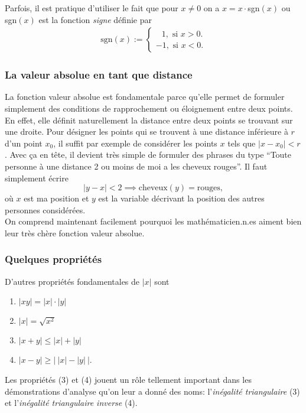 \documentclass[oneside,11pt,french,table]{book}
\theoremstyle{definition}
\theoremstyle{plain}
\theoremstyle{remark}
\begin{document}
    Parfois, il est pratique d'utiliser le fait que pour $x\ne 0$ on a $x=x\cdot$sgn$(x)$ ou sgn$(x)$ est la fonction \textit{signe} définie par 
    \begin{align*}
        \text{sgn}(x):=\begin{cases} \; \; \, 1, \text{ si } x> 0. \\ 
        -1, \text{ si } x<0.
        \end{cases}
    \end{align*}
    \subsubsection{La valeur absolue en tant que distance}
    \noindent
    La fonction valeur absolue est fondamentale parce qu'elle permet de formuler simplement des conditions de rapprochement ou éloignement entre deux points. 
    En effet, elle définit naturellement la distance entre deux points se trouvant sur une droite. Pour désigner les points qui se trouvent à une distance inférieure à $r$ d'un point $x_0$, il suffit par exemple de considérer les points $x$ tels que $|x-x_0|<r$.
    Avec ça en tête, il devient très simple de formuler des phrases du type ``Toute personne à une distance 2 ou moins de moi a les cheveux rouges''. Il faut simplement écrire
    \[
        |y-x|<2\implies \text{cheveux}(y) = \text{rouges},
    \]
    où $x$ est ma position et $y$ est la variable décrivant la position des autres personnes considérées. \\
    On comprend maintenant facilement pourquoi les mathématicien.n.es aiment bien leur très chère fonction valeur absolue.
    \subsubsection{Quelques propriétés}
    \noindent
    D'autres propriétés fondamentales de $|x|$ sont 
    \begin{center}
        \begin{minipage}{0.35\textwidth}
            \begin{enumerate}
                \item $|xy|=|x| \cdot |y|$
                \item $|x|=\sqrt{x^2}$
                \item $|x+y|\leq |x|+|y|$ 
                \item $|x-y|\geq \big|\ |x|-|y|\ \big|$.
            \end{enumerate}
        \end{minipage}
    \end{center}
    Les propriétés (3) et (4) jouent un rôle tellement important dans les démonstrations d'analyse qu'on leur a donné des noms: l'\textit{inégalité triangulaire} (3) et l'\textit{inégalité triangulaire inverse} (4).
    
\end{document}
